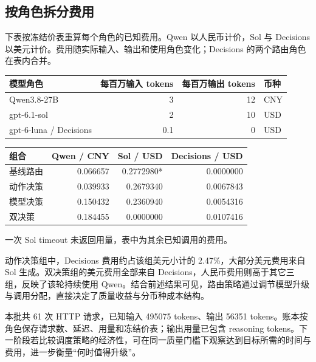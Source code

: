 \subsection{按角色拆分费用}
下表按冻结价表重算每个角色的已知费用。Qwen 以人民币计价，Sol 与 Decisions 以美元计价。费用随实际输入、输出和使用角色变化；Decisions 的两个路由角色在表内合并。

\begin{smalltable}
\begin{tabularx}{\linewidth}{@{}Lrrl@{}}\toprule
模型角色 & 每百万输入 tokens & 每百万输出 tokens & 币种\\\midrule
Qwen3.8-27B & 3 & 12 & CNY\\
gpt-6.1-sol & 2 & 10 & USD\\
gpt-6-luna / Decisions & 0.1 & 0 & USD\\\bottomrule
\end{tabularx}
\end{smalltable}

\begin{smalltable}
\begin{tabularx}{\linewidth}{@{}Lrrr@{}}\toprule
组合 & Qwen / CNY & Sol / USD & Decisions / USD\\\midrule
基线路由 & 0.066657 & 0.2772980* & 0.0000000\\
动作决策 & 0.039933 & 0.2679340 & 0.0067843\\
模型决策 & 0.150432 & 0.2360940 & 0.0054316\\
双决策 & 0.184455 & 0.0000000 & 0.0107416\\\bottomrule
\end{tabularx}
{\footnotesize * 一次 Sol timeout 未返回用量，表中为其余已知调用的费用。}
\end{smalltable}

动作决策组中，Decisions 费用约占该组美元小计的 2.47\%，大部分美元费用来自 Sol 生成。双决策组的美元费用全部来自 Decisions，人民币费用则高于其它三组，反映了该轮持续使用 Qwen。结合前述结果可见，路由策略通过调节模型升级与调用分配，直接决定了质量收益与分币种成本结构。

本批共 61 次 HTTP 请求，已知输入 495075 tokens、输出 56351 tokens。账本按角色保存请求数、延迟、用量和冻结价表；输出用量已包含 reasoning tokens。下一阶段若比较调度策略的经济性，可在同一质量门槛下观察达到目标所需的时间与费用，进一步衡量“何时值得升级”。

